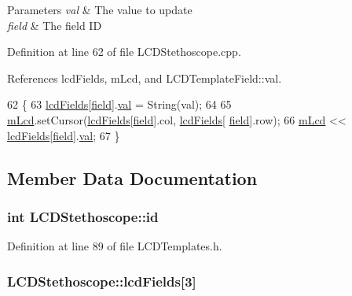 \begin{DoxyParams}{Parameters}
{\em val} & The value to update \\
\hline
{\em field} & The field I\-D \\
\hline
\end{DoxyParams}


Definition at line 62 of file L\-C\-D\-Stethoscope.\-cpp.



References lcd\-Fields, m\-Lcd, and L\-C\-D\-Template\-Field\-::val.


\begin{DoxyCode}
62                                                      \{
63   \hyperlink{class_l_c_d_stethoscope_ad36003e685beee5f2268fd4ef1f0db8c}{lcdFields}[\hyperlink{_l_c_d_templates_8h_a20a49e010fbfc3a43959f12d92e01bb6}{field}].\hyperlink{struct_l_c_d_template_field_a6eb7ce0547fc28ac3a2538f0fac3f117}{val} = String(val);
64 
65   \hyperlink{class_l_c_d_stethoscope_af91304920f29b700ae27aee8aba23ac1}{mLcd}.setCursor(\hyperlink{class_l_c_d_stethoscope_ad36003e685beee5f2268fd4ef1f0db8c}{lcdFields}[\hyperlink{struct_l_c_d_template_field}{field}].col, \hyperlink{class_l_c_d_stethoscope_ad36003e685beee5f2268fd4ef1f0db8c}{lcdFields}[
      \hyperlink{struct_l_c_d_template_field}{field}].row);
66   \hyperlink{class_l_c_d_stethoscope_af91304920f29b700ae27aee8aba23ac1}{mLcd} << \hyperlink{class_l_c_d_stethoscope_ad36003e685beee5f2268fd4ef1f0db8c}{lcdFields}[\hyperlink{_l_c_d_templates_8h_a20a49e010fbfc3a43959f12d92e01bb6}{field}].\hyperlink{struct_l_c_d_template_field_a6eb7ce0547fc28ac3a2538f0fac3f117}{val};
67 \}
\end{DoxyCode}


\subsection{Member Data Documentation}
\hypertarget{class_l_c_d_stethoscope_a865d5b5da67eb0841c34b1a436ef28ba}{
\subsubsection[{id}]{\setlength{\rightskip}{0pt plus 5cm}int L\-C\-D\-Stethoscope\-::id}}\label{class_l_c_d_stethoscope_a865d5b5da67eb0841c34b1a436ef28ba}


Definition at line 89 of file L\-C\-D\-Templates.\-h.

\hypertarget{class_l_c_d_stethoscope_ad36003e685beee5f2268fd4ef1f0db8c}{
\subsubsection[{lcd\-Fields}]{ L\-C\-D\-Stethoscope\-::lcd\-Fields\mbox{[}3\mbox{]}}}\label{class_l_c_d_stethoscope_ad36003e685beee5f2268fd4ef1f0db8c}


